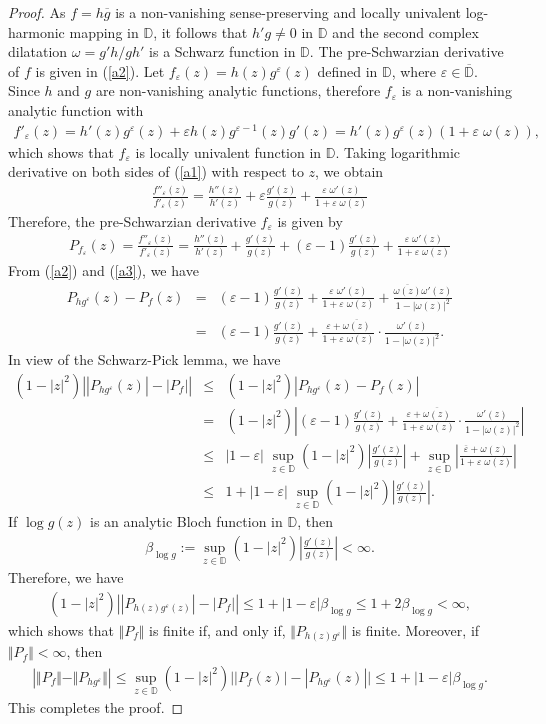\documentclass[12pt,reqno]{amsart}
\newtheorem{open problem}{Open problem}[section]
\newcommand{\ol}{\overline}
\newcommand{\beas}{\begin{eqnarray*}}
\newcommand{\eeas}{\end{eqnarray*}}
\newcommand{\bea}{\begin{eqnarray}}
\newcommand{\eea}{\end{eqnarray}}
\renewcommand{\epsilon}{\varepsilon}
\numberwithin{equation}{section}
\begin{document}
\begin{proof}
As $f=h\overline{g}$ is a non-vanishing sense-preserving and locally univalent log-harmonic mapping in $\mathbb{D}$, it follows that $h'g \neq 0$ in $\mathbb{D}$ and the second complex dilatation $\omega=g'h/gh'$ is a Schwarz function in $\mathbb{D}$. The pre-Schwarzian derivative of $f$ is given in (\ref{a2}).
Let $f_\epsilon(z)=h(z)g^{\epsilon}(z)$ defined in $\mathbb{D}$, where $\epsilon\in\ol{\mathbb{D}}$. Since $h$ and $g$ are non-vanishing analytic functions, therefore $f_\epsilon$ is a non-vanishing analytic function with 
\bea\label{a1} f'_\epsilon(z)=h'(z)g^{\epsilon}(z)+\epsilon h(z)g^{\epsilon-1}(z)g'(z)=h'(z)g^\epsilon(z)\left(1+\epsilon\;\omega(z) \right),\eea
which shows that $f_\epsilon$ is locally univalent function in $\mathbb{D}$. Taking logarithmic derivative on both sides of (\ref{a1}) with respect to $z$, we obtain
\beas \frac{f''_\epsilon(z)}{f'_\epsilon(z)}=\frac{h''(z)}{h'(z)}+\epsilon \frac{g'(z)}{g(z)}+\frac{\epsilon\;\omega'(z) }{1+\epsilon\;\omega(z) }\eeas
 Therefore, the pre-Schwarzian derivative $f_{\epsilon}$ is given by
\bea\label{a3}
P_{f_\epsilon}(z)=\frac{f''_\epsilon(z)}{f'_\epsilon(z)}=\frac{h''(z)}{h'(z)}+ \frac{g'(z)}{g(z)}+(\epsilon-1) \frac{g'(z)}{g(z)}+\frac{\epsilon\;\omega'(z) }{1+\epsilon\;\omega(z) }
\eea
From (\ref{a2}) and (\ref{a3}), we have
\bea\label{a4}
P_{hg^{\epsilon}}(z)-P_f(z)&=&(\epsilon-1) \frac{g'(z)}{g(z)}+\frac{\epsilon\;\omega'(z) }{1+\epsilon\;\omega(z) }+\frac{\overline{\omega(z)}\omega'(z)}{1-|\omega(z)|^2}\nonumber\\[2mm]
&=&(\epsilon-1) \frac{g'(z)}{g(z)}+\frac{\epsilon+\ol{\omega(z)} }{1+\epsilon\;\omega(z) }\cdot\frac{\omega'(z)}{1-|\omega(z)|^2}. \eea
In view of the Schwarz-Pick lemma, we have
\beas
(1-|z|^2)\left||P_{hg^{\epsilon}}(z)|-|P_f|\right|&\leq & (1-|z|^2)\left|P_{hg^{\epsilon}}(z)-P_f(z)\right| \\
&=&  (1-|z|^2)\left|(\epsilon-1) \frac{g'(z)}{g(z)}+\frac{\epsilon+\ol{\omega(z)}}{1+\epsilon\;\omega(z) }\cdot\frac{\omega'(z)}{1-|\omega(z)|^2}\right|\\
&\leq &|1-\epsilon|\;\sup_{z\in\mathbb{D}}(1-|z|^2)\left| \frac{g'(z)}{g(z)}\right|+\sup_{z\in\mathbb{D}}\left|\frac{\ol{\epsilon}+\omega(z) }{1+\epsilon\;\omega(z) }\right|\\[2mm]
&\leq&1+|1-\epsilon|\;\sup_{z\in\mathbb{D}}(1-|z|^2)\left| \frac{g'(z)}{g(z)}\right|.\eeas
If $\log{g(z)}$ is an analytic Bloch function in $\mathbb{D}$, then
\beas \beta_{\log{g}}:=\sup_{z\in\mathbb{D}}(1-|z|^2)\left|\frac{g'(z)}{g(z)}\right|<\infty.\eeas
Therefore, we have
\beas (1-|z|^2)\left||P_{h(z)g^{\epsilon}(z)}|-|P_f|\right|\leq  1+|1-\epsilon|\beta_{\log{g}}\leq 1+2\beta_{\log{g}}<\infty,\eeas
which shows that $\Vert P_f\Vert$ is finite if, and only if, $\Vert P_{h(z)g^{\epsilon}}\Vert$ is finite. Moreover, if $\Vert P_f\Vert<\infty$, then
\beas
\left|\Vert P_f\Vert-\Vert P_{hg^{\epsilon}}\Vert\right|\leq \sup_{z\in\mathbb{D}} (1-|z|^2)\Big||P_f(z)|-|P_{hg^{\epsilon}}(z)|\Big|\leq 1+ |1-\epsilon|\beta_{\log{g}}.
\eeas
This completes the proof.
\end{proof}
\end{document}
